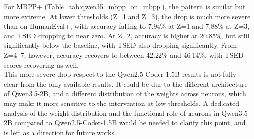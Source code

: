\documentclass[mscthesis]{usiinfthesis}
\begin{document}
\begin{table}[h]
\centering
\caption{Qwen3.5-2B: HumanEval+ accuracy when masking HumanEval+ specific neurons.}
\label{tab:qwen35_humaneval_on_humaneval}
\end{table}

  
For MBPP+ (Table~\ref{tab:qwen35_mbpp_on_mbpp}), the pattern is similar but more extreme.
At lower thresholds (Z=1 and Z=3), the drop is much more severe than on HumanEval+, with
accuracy falling to 7.94\% at Z=1 and 7.88\% at Z=3, and TSED dropping to near zero.
At Z=2, accuracy is higher at 20.85\%, but still significantly below the baseline, with TSED also dropping significantly.
From Z=4--7, however, accuracy recovers to between 42.22\% and 46.14\%, with TSED scores recovering as well.\\
This more severe drop respect to the Qwen2.5-Coder-1.5B results is not fully clear from
the only available results.
It could be due to the different architecture of Qwen3.5-2B, and a different distribution
of the weights across neurons, which may make it more sensitive to the intervention at low thresholds.
A dedicated analysis of the weight distribution and the functional role of neurons in Qwen3.5-2B compared to Qwen2.5-Coder-1.5B would be needed to clarify this point, and is left as a direction for future works.
\end{document}
